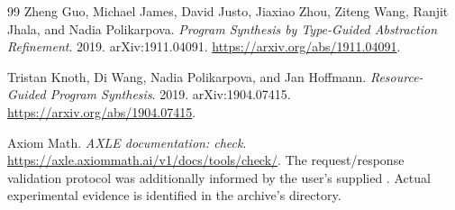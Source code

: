 \begin{thebibliography}{99}
Zheng Guo, Michael James, David Justo, Jiaxiao Zhou, Ziteng Wang, Ranjit Jhala, and Nadia Polikarpova.
\emph{Program Synthesis by Type-Guided Abstraction Refinement}. 2019. arXiv:1911.04091.
\url{https://arxiv.org/abs/1911.04091}.

Tristan Knoth, Di Wang, Nadia Polikarpova, and Jan Hoffmann.
\emph{Resource-Guided Program Synthesis}. 2019. arXiv:1904.07415.
\url{https://arxiv.org/abs/1904.07415}.

Axiom Math. \emph{AXLE documentation: check}.
\url{https://axle.axiommath.ai/v1/docs/tools/check/}.
The request/response validation protocol was additionally informed by the user's supplied . Actual experimental evidence is identified in the archive's  directory.
\end{thebibliography}
